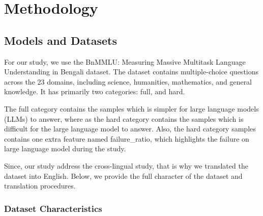\section{Methodology}

\subsection{Models and Datasets}

For our study, we use the BnMMLU: Measuring Massive Multitask Language Understanding in Bengali  dataset. The dataset contains multiple-choice questions across the 23 domains, including science, humanities, mathematics, and general knowledge. It has primarily two categories: full, and hard.

The full category contains the samples which is simpler for large language models (LLMs) to answer, where as the hard category contains the samples which is difficult for the large language model to answer. Also, the hard category samples contains one extra feature named failure\_ratio, which highlights the failure on large language model during the study.

Since, our study address the cross-lingual study, that is why we translated the dataset into English. Below, we provide the full character of the dataset and translation procedures.

\newpage

\subsubsection{Dataset Characteristics}



